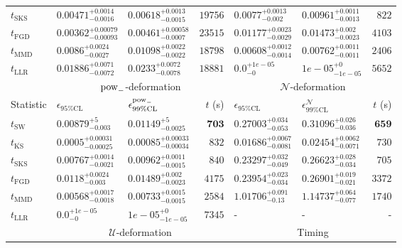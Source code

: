\begin{tabular}{l|llr|llr}
	$t_{\mathrm{SKS}}$ & $0.00471_{-0.0016}^{+0.0014}$ & $0.00618_{-0.0015}^{+0.0013}$ & $19756$ & $0.0077_{-0.002}^{+0.0013}$ & $0.00961_{-0.0013}^{+0.0011}$ & $822$ \\
	$t_{\mathrm{FGD}}$ & ${\mathbf{0.00362_{-0.00093}^{+0.00079}}}$ & ${\mathbf{0.00461_{-0.0007}^{+0.00058}}}$ & $23515$ & $0.01177_{-0.0029}^{+0.0023}$ & $0.01473_{-0.0023}^{+0.002}$ & $4103$ \\
	$t_{\mathrm{MMD}}$ & $0.0086_{-0.0027}^{+0.0024}$ & $0.01098_{-0.0022}^{+0.0022}$ & $18798$ & $0.00608_{-0.0014}^{+0.0012}$ & $0.00762_{-0.0011}^{+0.0011}$ & $2406$ \\
	$t_{\mathrm{LLR}}$ & $0.01886_{-0.0072}^{+0.0071}$ & $0.0233_{-0.0078}^{+0.0072}$ & $18881$ & $0.0_{-0}^{+1e-05}$ & $1e-05_{-1e-05}^{+0}$ & $5652$ \\
	\toprule
	\multicolumn{1}{c}{} & \multicolumn{3}{c}{$\rm{pow}_{-}$-deformation} & \multicolumn{3}{c}{$\mathcal{N}$-deformation} \\
	Statistic & $\epsilon_{95\%\mathrm{CL}}$ & $\epsilon^  {\rm{pow}_{-}}_{99\%\mathrm{CL}}$ & $t$ (s) & $\epsilon_{95\%\mathrm{CL}}$ & $\epsilon^    {\mathcal{N}}_{99\%\mathrm{CL}}$ & $t$ (s) \\
	\midrule
	$t_{\mathrm{SW}}$ & $0.00879_{-0.003}^{+5}$ & $0.01149_{-0.0025}^{+5}$ & ${\mathbf{703}}$ & $0.27003_{-0.053}^{+0.034}$ & $0.31096_{-0.036}^{+0.026}$ & ${\mathbf{659}}$ \\
	$t_{\overline{\mathrm{KS}}}$ & ${\mathbf{0.0005_{-0.00025}^{+0.00031}}}$ & ${\mathbf{0.00085_{-0.00034}^{+0.00033}}}$ & $832$ & ${\mathbf{0.01686_{-0.0081}^{+0.0067}}}$ & ${\mathbf{0.02454_{-0.0071}^{+0.0062}}}$ & $730$ \\
	$t_{\mathrm{SKS}}$ & $0.00767_{-0.0021}^{+0.0014}$ & $0.00962_{-0.0015}^{+0.0011}$ & $840$ & $0.23297_{-0.049}^{+0.032}$ & $0.26623_{-0.034}^{+0.028}$ & $705$ \\
	$t_{\mathrm{FGD}}$ & $0.0118_{-0.003}^{+0.0024}$ & $0.01489_{-0.0023}^{+0.002}$ & $4175$ & $0.23954_{-0.034}^{+0.023}$ & $0.26901_{-0.021}^{+0.019}$ & $3372$ \\
	$t_{\mathrm{MMD}}$ & $0.00568_{-0.0018}^{+0.0017}$ & $0.00733_{-0.0015}^{+0.0015}$ & $2584$ & $1.01706_{-0.13}^{+0.091}$ & $1.14737_{-0.077}^{+0.064}$ & $1740$ \\
	$t_{\mathrm{LLR}}$ & $0.0_{-0}^{+1e-05}$ & $1e-05_{-1e-05}^{+0}$ & $7345$ & - & - & - \\
	\toprule
	\multicolumn{1}{c}{} & \multicolumn{3}{c}{$\mathcal{U}$-deformation} & \multicolumn{3}{c}{Timing} \\

\end{tabular}
